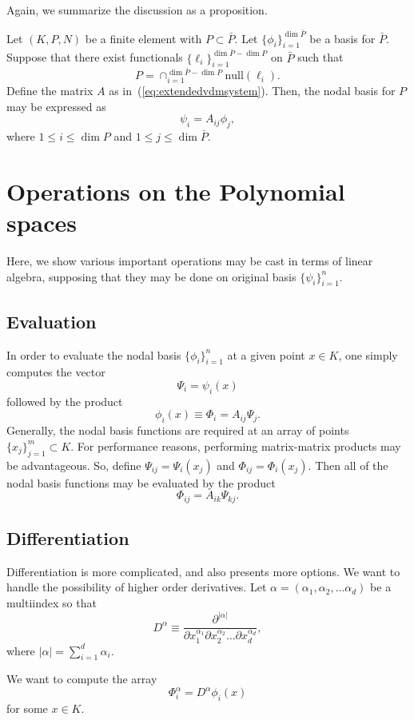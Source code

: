 Again, we summarize the discussion as a proposition.
\begin{proposition}
Let \( (K,P,N) \) be a finite element with \( P \subset \bar{P} \).
Let \( \{ \phi_i \}_{i=1}^{\dim \bar{P}} \) be a basis for \( \bar{P}
\).  Suppose that there exist functionals \( \{ \ell_i \}_{i=1}^{\dim \bar{P} -
  \dim P} \) on \( \bar{P} \) such that
\[
P = \cap_{i=1}^{\dim \bar{P} - \dim P} \mathrm{null}(\ell_i).
\]
Define the matrix \( A \) as in~(\ref{eq:extendedvdmsystem}).
Then, the nodal basis for \( P \) may be expressed as
\[
\psi_i = A_{ij} \phi_j,
\]
where \( 1 \leq i \leq \dim P \) and \( 1 \leq j \leq \dim \bar{P} \).
\end{proposition}

\section{Operations on the Polynomial spaces}
Here, we show various important operations may be cast
in terms of linear algebra, supposing that they may be done on
original basis \( \{ \psi_i \}_{i=1}^{n} \).

\subsection{Evaluation}
In order to evaluate the nodal basis \( \{ \phi_i \}_{i=1}^{n} \)
at a given point \( x \in K \), one simply computes the vector
\[
\Psi_i = \psi_i(x)
\]
followed by the product
\[
\phi_i(x) \equiv \Phi_i = A_{ij} \Psi_j.
\]
Generally, the nodal basis functions are required at an array of
points \( \{ x_j \}_{j=1}^{m} \subset K \).  For performance reasons,
performing matrix-matrix products may be advantageous.  So, define
\( \Psi_{ij} = \Psi_i(x_j) \)  and \( \Phi_{ij} = \Phi_i(x_j) \).
Then all of the nodal basis functions may be evaluated by the
product
\[
\Phi_{ij} = A_{ik} \Psi_{kj}.
\]
\subsection{Differentiation}
Differentiation is more complicated, and also presents more options.
We want to handle the possibility of higher order derivatives. Let
\( \alpha = ( \alpha_1 , \alpha_2 , \dots \alpha_d ) \) be a
multiindex so that
\[
D^\alpha \equiv \frac{\partial^{|\alpha|}}{\partial
  x_1^{\alpha_1} \partial x_2^{\alpha_2} \dots \partial x_d^{\alpha_d}},
\]
where \( |\alpha| = \sum_{i=1}^{d} \alpha_i \).

We want to compute the array
\[
\Phi^\alpha_i = D^\alpha \phi_i(x)
\]
for some \( x \in K \).

